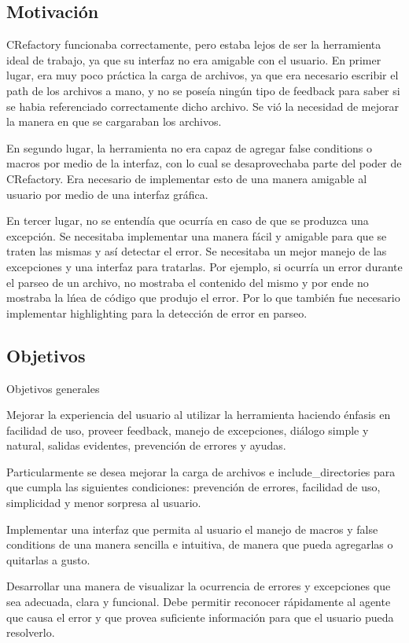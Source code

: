 \documentclass[a4paper,oneside,10pt]{article}
\begin{document}
\subsection{Motivaci\'on}
CRefactory funcionaba correctamente, pero estaba lejos de ser la herramienta ideal de trabajo, ya que su interfaz no era amigable con el usuario. En primer lugar, era muy poco pr\'actica la carga de archivos, ya que era necesario escribir el path de los archivos a mano, y no se pose\'ia ning\'un tipo de feedback para saber si se habia referenciado correctamente dicho archivo. Se vi\'o la necesidad de mejorar la manera en que se cargaraban los archivos.

En segundo lugar, la herramienta no era capaz de agregar false conditions o macros por medio de la interfaz, con lo cual se desaprovechaba  parte del poder de CRefactory. Era necesario de implementar esto de una manera amigable al usuario por medio de una interfaz gr\'afica.

En tercer lugar, no se entend\'ia que ocurr\'ia en caso de que se produzca una excepci\'on. Se necesitaba implementar una manera f\'acil y amigable para que se traten las mismas y as\'i detectar el error. Se necesitaba un mejor manejo de las excepciones y una interfaz para tratarlas.
Por ejemplo, si ocurr\'ia un error durante el parseo de un archivo, no mostraba el contenido del mismo y por ende no mostraba la l\'nea de c\'odigo que produjo el error. Por lo que tambi\'en fue necesario implementar highlighting para la detecci\'on de error en parseo.


\subsection{Objetivos}
Objetivos generales

Mejorar la experiencia del usuario al utilizar la herramienta haciendo \'enfasis en facilidad de uso, proveer feedback, manejo de excepciones, di\'alogo simple y natural, salidas evidentes, prevenci\'on de errores y ayudas.

Particularmente se desea mejorar la carga de archivos e include\_directories para que cumpla las siguientes condiciones: prevenci\'on de errores, facilidad de uso, simplicidad y menor sorpresa al usuario.

Implementar una interfaz que permita al usuario el manejo de macros y false conditions de una manera sencilla e intuitiva, de manera que pueda agregarlas o quitarlas a gusto.

Desarrollar una manera de visualizar la ocurrencia de errores y excepciones que sea adecuada, clara y funcional. Debe permitir reconocer r\'apidamente al agente que causa el error y que provea suficiente informaci\'on para que el usuario pueda resolverlo.
\end{document}
